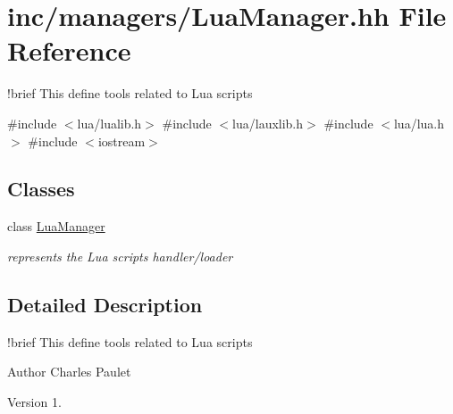 \hypertarget{LuaManager_8hh}{}\section{inc/managers/\+Lua\+Manager.hh File Reference}
\label{LuaManager_8hh}


!brief This define tools related to Lua scripts  


{\ttfamily \#include $<$lua/lualib.\+h$>$}\newline
{\ttfamily \#include $<$lua/lauxlib.\+h$>$}\newline
{\ttfamily \#include $<$lua/lua.\+h$>$}\newline
{\ttfamily \#include $<$iostream$>$}\newline
\subsection*{Classes}
\begin{DoxyCompactItemize}
\item 
class \hyperlink{classLuaManager}{Lua\+Manager}
\begin{DoxyCompactList}\small\item\em represents the Lua scripts handler/loader \end{DoxyCompactList}\end{DoxyCompactItemize}


\subsection{Detailed Description}
!brief This define tools related to Lua scripts 

\begin{DoxyAuthor}{Author}
Charles Paulet 
\end{DoxyAuthor}
\begin{DoxyVersion}{Version}
1. 
\end{DoxyVersion}
